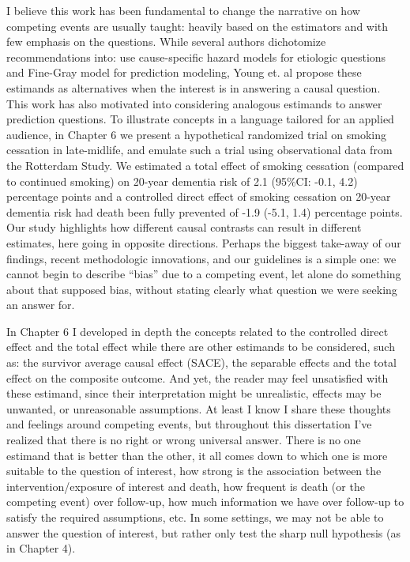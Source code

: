 \documentclass[
]{book}
\begin{document}
I believe this work has been fundamental to change the narrative on how competing events are usually taught: heavily based on the estimators and with few emphasis on the questions. While several authors dichotomize recommendations into: use cause-specific hazard models for etiologic questions and Fine-Gray model for prediction modeling\autocite{lau2009,austin2016}, Young et. al propose these estimands as alternatives when the interest is in answering a causal question\autocite{young2020}. This work has also motivated into considering analogous estimands to answer prediction questions\autocite{geloven2020}. To illustrate concepts in a language tailored for an applied audience, in Chapter 6 we present a hypothetical randomized trial on smoking cessation in late-midlife, and emulate such a trial using observational data from the Rotterdam Study. We estimated a total effect of smoking cessation (compared to continued smoking) on 20-year dementia risk of 2.1 (95\%CI: -0.1, 4.2) percentage points and a controlled direct effect of smoking cessation on 20-year dementia risk had death been fully prevented of -1.9 (-5.1, 1.4) percentage points. Our study highlights how different causal contrasts can result in different estimates, here going in opposite directions. Perhaps the biggest take-away of our findings, recent methodologic innovations, and our guidelines is a simple one: we cannot begin to describe ``bias'' due to a competing event, let alone do something about that supposed bias, without stating clearly what question we were seeking an answer for.

In Chapter 6 I developed in depth the concepts related to the controlled direct effect and the total effect while there are other estimands to be considered, such as: the survivor average causal effect (SACE)\autocite{frangakis2002}, the separable effects \autocite{stensrud2019} and the total effect on the composite outcome. And yet, the reader may feel unsatisfied with these estimand, since their interpretation might be unrealistic, effects may be unwanted, or unreasonable assumptions. At least I know I share these thoughts and feelings around competing events, but throughout this dissertation I've realized that there is no right or wrong universal answer. There is no one estimand that is better than the other, it all comes down to which one is more suitable to the question of interest, how strong is the association between the intervention/exposure of interest and death, how frequent is death (or the competing event) over follow-up, how much information we have over follow-up to satisfy the required assumptions, etc. In some settings, we may not be able to answer the question of interest, but rather only test the sharp null hypothesis (as in Chapter 4).
\end{document}
